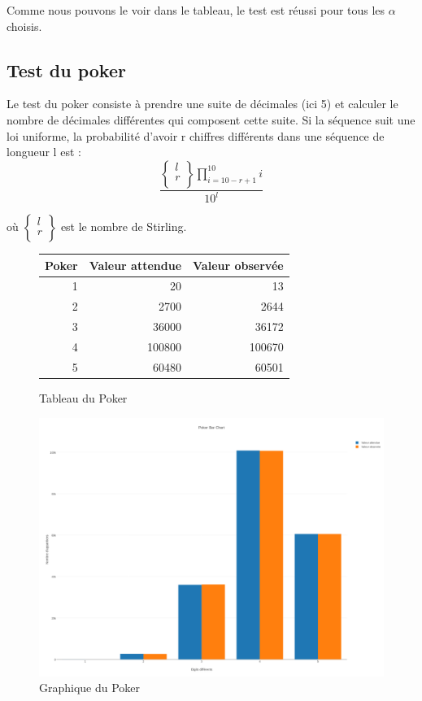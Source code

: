\documentclass[10pt,a4paper]{article}
\begin{document}
	Comme nous pouvons le voir dans le tableau, le test est réussi pour tous les $\alpha$ choisis.
	
	\newpage
	\subsection{Test du poker}
	Le test du poker consiste à prendre une suite de décimales (ici 5) et calculer le nombre de décimales différentes qui composent cette suite. Si la séquence suit une loi uniforme, la probabilité d'avoir r chiffres différents dans une séquence de longueur l est :
	\[
		\frac{
			\left\{
				\begin{array}{l}
					l\\
					r\\
				\end{array}
			\right\}
			\prod_{i=10-r+1}^{10}i
		}{10^l}
	\]
	
	où $\left\{
	\begin{array}{l}
	l\\
	r\\
	\end{array}
	\right\}$ est le nombre de Stirling.
	
	\begin{figure}[h]
		\centering
		\begin{tabular}{|r|r|r|}
			\hline
			Poker & Valeur attendue & Valeur observée\\
			\hline
			1 & 20 & 13\\
			2 & 2700 & 2644\\
			3 & 36000 & 36172\\
			4 & 100800 & 100670\\
			5 & 60480 & 60501\\
			\hline
		\end{tabular}
		\caption{Tableau du Poker}
	\end{figure}
	
	\begin{figure}[h]
		\centering
		\includegraphics[scale=0.25]{../chart_images/poker_bar_chart.png}
		\caption{Graphique du Poker}
	\end{figure}
	
\end{document}
